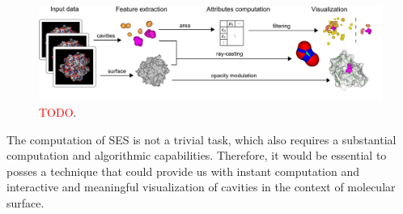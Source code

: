 \begin{figure}[tb]
  \centering
  \includegraphics[width=\textwidth]{image/overview.png}
  \caption{\textcolor{red}{TODO}.}
	\label{fig:overview}
\end{figure}


The computation of SES is not a trivial task, which also requires a substantial computation and algorithmic capabilities. 
Therefore, it would be essential to posses a technique that could provide us with instant computation and interactive and meaningful visualization of cavities in the context of molecular surface.

